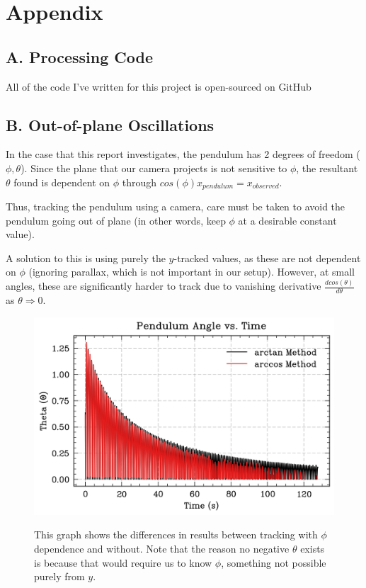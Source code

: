 \documentclass[prl,twocolumn,amsmath,amssymb,superscriptaddress]{revtex4-2}
\begin{document}
\section{Appendix}

\subsection{A. Processing Code}

All of the code I've written for this project is open-sourced on GitHub

\subsection{B. Out-of-plane Oscillations}

In the case that this report investigates, the pendulum has 2 degrees of freedom ($\phi, \theta$). Since the plane that our camera projects is not sensitive to $\phi$, the resultant $\theta$ found is dependent on $\phi$ through $cos(\phi)x_{pendulum} = x_{observed}$.

Thus, tracking the pendulum using a camera, care must be taken to avoid the pendulum going out of plane (in other words, keep $\phi$ at a desirable constant value).

A solution to this is using purely the $y$-tracked values, as these are not dependent on $\phi$ (ignoring parallax, which is not important in our setup).
However, at small angles, these are significantly harder to track due to vanishing derivative $\frac{dcos(\theta)}{d\theta}$ as $\theta \Rightarrow 0$.


\begin{figure}[htb]
    \includegraphics[width=0.5\linewidth]{out-of-plane.png}
    \label{fig:out-of-plane}
    \caption{This graph shows the differences in results between tracking with $\phi$ dependence and without. Note that the reason no negative $\theta$ exists is because that would require us to know $\phi$, something not possible purely from $y$.}
\end{figure}
\end{document}

